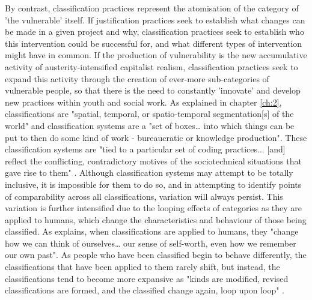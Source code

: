 By contrast, classification practices represent the atomisation of the category of 'the vulnerable' itself. If justification practices seek to establish what changes can be made in a given project and why, classification practices seek to establish who this intervention could be successful for, and what different types of intervention might have in common. If the production of vulnerability is the new accumulative activity of austerity-intensified capitalist realism, classification practices seek to expand this activity through the creation of ever-more sub-categories of vulnerable people, so that there is the need to constantly 'innovate' and develop new practices within youth and social work. As explained in chapter \ref{ch:2}, classifications are "spatial, temporal, or spatio-temporal segmentation[s] of the world" \citep[110]{bowker_sorting_1999} and classification systems are a "set of boxes\ldots{} into which things can be put to then do some kind of work - bureaucratic or knowledge production". These classification systems are "tied to a particular set of coding practices... [and] reflect the conflicting, contradictory motives of the sociotechnical situations that gave rise to them" \cite[64]{bowker_sorting_1999}.  Although classification systems may attempt to be totally inclusive, it is impossible for them to do so, and in attempting to identify points of comparability across all classifications, variation will always persist.  This variation is further intensified due to the looping effects of categories as they are applied to humans, which change the characteristics and behaviour of those being classified. As \citet{hacking_looping_1996} explains, when classifications are applied to humans, they "change how we can think of ourselves\ldots{} our sense of self-worth, even how we remember our own past". As people who have been classified begin to behave differently, the classifications that have been applied to them rarely shift, but instead, the classifications tend to become more expansive as "kinds are modified, revised classifications are formed, and the classified change again, loop upon loop" \citep[370]{hacking_looping_1996}.

